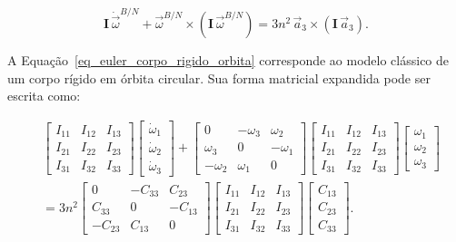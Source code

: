 \begin{equation}
\mathbf{I}\,\dot{\vec{\omega}}^{B/N}
+
\vec{\omega}^{B/N}\times\left(\mathbf{I}\,\vec{\omega}^{B/N}\right)
=
3n^2\,\vec{a}_3 \times \left(\mathbf{I}\,\vec{a}_3\right).
\label{eq_euler_corpo_rigido_orbita}
\end{equation}


A Equação~\eqref{eq_euler_corpo_rigido_orbita} corresponde ao modelo clássico de um corpo rígido em órbita circular. Sua forma matricial expandida pode ser escrita como:

\begin{equation} %
\begin{split}
&
\begin{bmatrix}
I_{11} & I_{12} & I_{13}\\
I_{21} & I_{22} & I_{23}\\
I_{31} & I_{32} & I_{33}
\end{bmatrix}
\begin{bmatrix}
\dot{\omega}_1\\
\dot{\omega}_2\\
\dot{\omega}_3
\end{bmatrix}
+
\begin{bmatrix}
0 & -\omega_3 & \omega_2\\
\omega_3 & 0 & -\omega_1\\
-\omega_2 & \omega_1 & 0
\end{bmatrix}
\begin{bmatrix}
I_{11} & I_{12} & I_{13}\\
I_{21} & I_{22} & I_{23}\\
I_{31} & I_{32} & I_{33}
\end{bmatrix}
\begin{bmatrix}
\omega_1\\
\omega_2\\
\omega_3
\end{bmatrix}
\\[1ex]
&=
3n^2
\begin{bmatrix}
0 & -C_{33} & C_{23}\\
C_{33} & 0 & -C_{13}\\
-C_{23} & C_{13} & 0
\end{bmatrix}
\begin{bmatrix}
I_{11} & I_{12} & I_{13}\\
I_{21} & I_{22} & I_{23}\\
I_{31} & I_{32} & I_{33}
\end{bmatrix}
\begin{bmatrix}
C_{13}\\
C_{23}\\
C_{33}
\end{bmatrix}.
\end{split}
\label{eq_euler_gg_expandida}
\end{equation}

